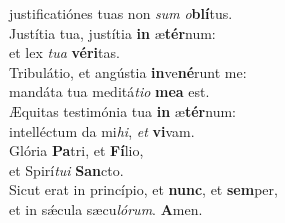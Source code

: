 \oddverse justificatiónes tuas non \textit{sum} \textit{o}\textbf{blí}tus.\\
\evenverse Justítia tua, justítia \textbf{in} æ\textbf{tér}num:~\*\\
\evenverse et lex \textit{tu}\textit{a} \textbf{vé}\textbf{ri}tas.\\
\oddverse Tribulátio, et angústia \textbf{in}ve\textbf{né}runt me:~\*\\
\oddverse mandáta tua meditá\textit{ti}\textit{o} \textbf{me}\textbf{a} est.\\
\evenverse Æquitas testimónia tua \textbf{in} æ\textbf{tér}num:~\*\\
\evenverse intelléctum da mi\textit{hi}, \textit{et} \textbf{vi}vam.\\
\oddverse Glória \textbf{Pa}tri, et \textbf{Fí}lio,~\*\\
\oddverse et Spirí\textit{tu}\textit{i} \textbf{San}cto.\\
\evenverse Sicut erat in princípio, et \textbf{nunc}, et \textbf{sem}per,~\*\\
\evenverse et in sǽcula sæcu\textit{ló}\textit{rum}. \textbf{A}men.\\
